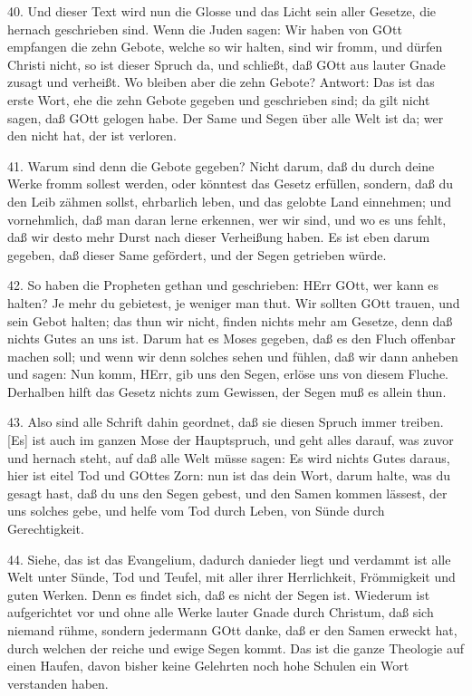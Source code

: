 40. Und dieser Text wird nun die Glosse und das Licht sein aller Gesetze, die hernach geschrieben sind. Wenn die Juden sagen: Wir haben von GOtt empfangen die zehn Gebote, welche so wir halten, sind wir fromm, und dürfen Christi nicht, so ist dieser Spruch da, und schließt, daß GOtt aus lauter Gnade zusagt und verheißt. Wo bleiben aber die zehn Gebote? Antwort: Das ist das erste Wort, ehe die zehn Gebote gegeben und geschrieben sind; da gilt nicht sagen, daß GOtt gelogen habe. Der Same und Segen über alle Welt ist da; wer den nicht hat, der ist verloren.

41. Warum sind denn die Gebote gegeben? Nicht darum, daß du durch deine Werke fromm sollest werden, oder könntest das Gesetz erfüllen, sondern, daß du den Leib zähmen sollst, ehrbarlich leben, und das gelobte Land einnehmen; und vornehmlich, daß man daran lerne erkennen, wer wir sind, und wo es uns fehlt, daß wir desto mehr Durst nach dieser Verheißung haben. Es ist eben darum gegeben, daß dieser Same gefördert, und der Segen getrieben würde.

42. So haben die Propheten gethan und geschrieben: HErr GOtt, wer kann es halten? Je mehr du gebietest, je weniger man thut. Wir sollten GOtt trauen, und sein Gebot halten; das thun wir nicht, finden nichts mehr am Gesetze, denn daß nichts Gutes an uns ist. Darum hat es Moses gegeben, daß es den Fluch offenbar machen soll; und wenn wir denn solches sehen und fühlen, daß wir dann anheben und sagen: Nun komm, HErr, gib uns den Segen, erlöse uns von diesem Fluche. Derhalben hilft das Gesetz nichts zum Gewissen, der Segen muß es allein thun.

43. Also sind alle Schrift dahin geordnet, daß sie diesen Spruch immer treiben. [Es] ist auch im ganzen Mose der Hauptspruch, und geht alles darauf, was zuvor und hernach steht, auf daß alle Welt müsse sagen: Es wird nichts Gutes daraus, hier ist eitel Tod und GOttes Zorn: nun ist das dein Wort, darum halte, was
du gesagt hast, daß du uns den Segen gebest, und den Samen kommen lässest, der uns solches gebe, und helfe vom Tod durch Leben, von Sünde durch Gerechtigkeit.

44. Siehe, das ist das Evangelium, dadurch danieder liegt und verdammt ist alle Welt unter Sünde, Tod und Teufel, mit aller ihrer Herrlichkeit, Frömmigkeit und guten Werken. Denn es findet sich, daß es nicht der Segen ist. Wiederum ist aufgerichtet vor und ohne alle Werke lauter Gnade durch Christum, daß sich niemand rühme, sondern jedermann GOtt danke, daß er den Samen erweckt hat, durch welchen der reiche und ewige Segen kommt. Das ist die ganze Theologie auf einen Haufen, davon bisher keine Gelehrten noch hohe Schulen ein Wort verstanden haben.

